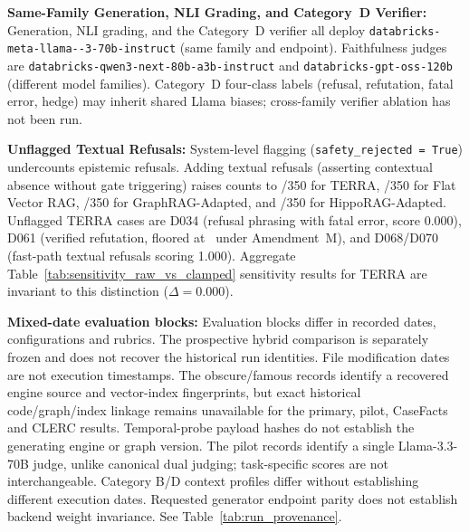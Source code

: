 \item \label{item:samefamily}\textbf{Same-Family Generation, NLI Grading, and Category~D Verifier:}
Generation, NLI grading, and the Category~D verifier all deploy \texttt{databricks-\allowbreak{}\allowbreak meta-\allowbreak{}\allowbreak llama-\allowbreak{}-\allowbreak{}3-\allowbreak{}70b-\allowbreak{}\allowbreak instruct} (same family and endpoint). Faithfulness judges are \texttt{databricks-\allowbreak{}\allowbreak qwen3-\allowbreak{}next-\allowbreak{}\allowbreak 80b-\allowbreak{}a3b-\allowbreak{}\allowbreak instruct} and \texttt{databricks-\allowbreak{}\allowbreak gpt-\allowbreak{}oss-\allowbreak{}120b} (different model families). Category~D four-class labels (refusal, refutation, fatal error, hedge) may inherit shared Llama biases; cross-family verifier ablation has not been run.

\item \textbf{Unflagged Textual Refusals:}
System-level flagging (\texttt{safety\_\allowbreak{}rejected = True}) undercounts epistemic refusals. Adding textual refusals (asserting contextual absence without gate triggering) raises counts to \TerraEpistemicRefusals/350 for TERRA, \FlatEpistemicRefusals/350 for Flat Vector RAG, \GraphEpistemicRefusals/350 for GraphRAG-Adapted, and \HippoEpistemicRefusals/350 for HippoRAG-Adapted. Unflagged TERRA cases are D034 (refusal phrasing with fatal error, score 0.000), D061 (verified refutation, floored at \AmendmentMFloorScore\ under Amendment~M), and D068/D070 (fast-path textual refusals scoring 1.000). Aggregate Table~\ref{tab:sensitivity_raw_vs_clamped} sensitivity results for TERRA are invariant to this distinction ($\Delta = 0.000$).

\item \textbf{Mixed-date evaluation blocks:} Evaluation blocks differ in recorded dates, configurations and rubrics. The prospective hybrid comparison is separately frozen and does not recover the historical run identities. File modification dates are not execution timestamps. The obscure/famous records identify a recovered engine source and vector-index fingerprints, but exact historical code/graph/index linkage remains unavailable for the primary, pilot, CaseFacts and CLERC results. Temporal-probe payload hashes do not establish the generating engine or graph version. The pilot records identify a single Llama-3.3-70B judge, unlike canonical dual judging; task-specific scores are not interchangeable. Category B/D context profiles differ without establishing different execution dates. Requested generator endpoint parity does not establish backend weight invariance. See Table~\ref{tab:run_provenance}.

